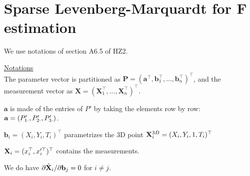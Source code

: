 


\maketitle

\section{Sparse Levenberg-Marquardt for F estimation}
We use notations of section A6.5 of HZ2.

\underline{Notations}\\
The parameter vector is partitioned as $\mathbf{P}=(\mathbf{a}^\top,\mathbf{b}_1^\top, \ldots, \mathbf{b}_n^\top)^\top$, and the measurement vector as $\mathbf{X}=(\mathbf{X}_1^\top, \ldots, \mathbf{X}_n^\top)^\top$.

$\mathbf{a}$ is made of the entries of $P'$ by taking the elements row by row: $\mathbf{a}=({P'_{1 \cdot}},{P'_{2 \cdot}},{P'_{3 \cdot}})$.

$\mathbf{b}_i=(X_i,Y_i,T_i)^\top$ parametrizes the 3D point ${\mathbf{X}^{3D}_i}=(X_i,Y_i,1,T_i)^\top$

$\mathbf{X}_i=(x_i^\top,x_i'^\top)^\top$ contains the measurements.

We do have $\partial \hat{\mathbf{X}}_i / \partial \mathbf{b}_j=0$ for $i \neq j$.


